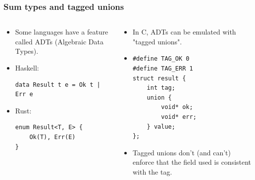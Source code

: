 \documentclass{beamer}
\begin{document}
\begin{frame}[fragile]
\frametitle{Sum types and tagged unions}
\begin{columns}
\begin{column}{0.5\textwidth}
\begin{itemize}
\item
Some languages have a feature called ADTs (Algebraic Data Types).
\item
Haskell:
\begin{Verbatim}[frame=single, fontsize=\scriptsize]
data Result t e = Ok t | Err e
\end{Verbatim}
\item
Rust:
\begin{Verbatim}[frame=single, fontsize=\scriptsize]
enum Result<T, E> {
    Ok(T), Err(E)
}
\end{Verbatim}
\end{itemize}
\end{column}
\begin{column}{0.5\textwidth}
\begin{itemize}
\item
In C, ADTs can be emulated with "tagged unions".
\item
\begin{Verbatim}[frame=single, fontsize=\scriptsize]
#define TAG_OK 0
#define TAG_ERR 1
struct result {
    int tag;
    union {
        void* ok;
        void* err;
    } value;
};
\end{Verbatim}
\item
Tagged unions don't (and can't) enforce that the field used is consistent with the tag.
\end{itemize}
\end{column}
\end{columns}
\end{frame}
\end{document}
